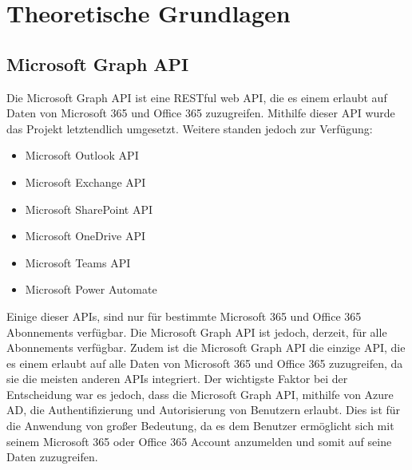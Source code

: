 


\section{Theoretische Grundlagen}\label{sec:Theoretische Grundlagen}

\subsection{Microsoft Graph API}\label{subsec:microsoft-graph-api}
Die Microsoft Graph API ist eine \gls{RESTful} web API, die es einem erlaubt auf Daten von Microsoft 365 und Office 365 zuzugreifen.
Mithilfe dieser API wurde das Projekt letztendlich umgesetzt.
Weitere standen jedoch zur Verfügung:
\begin{itemize}
    \item Microsoft Outlook API
    \item Microsoft Exchange API
    \item Microsoft SharePoint API
    \item Microsoft OneDrive API
    \item Microsoft Teams API
    \item Microsoft Power Automate
\end{itemize}
Einige dieser APIs, sind nur für bestimmte Microsoft 365 und Office 365 Abonnements verfügbar.
Die Microsoft Graph API ist jedoch, derzeit, für alle Abonnements verfügbar.
Zudem ist die Microsoft Graph API die einzige API, die es einem erlaubt auf alle Daten von Microsoft 365 und Office 365 zuzugreifen, da sie die meisten anderen APIs integriert.
Der wichtigste Faktor bei der Entscheidung war es jedoch, dass die Microsoft Graph API, mithilfe von Azure AD, die Authentifizierung und Autorisierung von Benutzern erlaubt. Dies ist für die Anwendung von großer Bedeutung, da es dem Benutzer ermöglicht sich mit seinem Microsoft 365 oder Office 365 Account anzumelden und somit auf seine Daten zuzugreifen.

